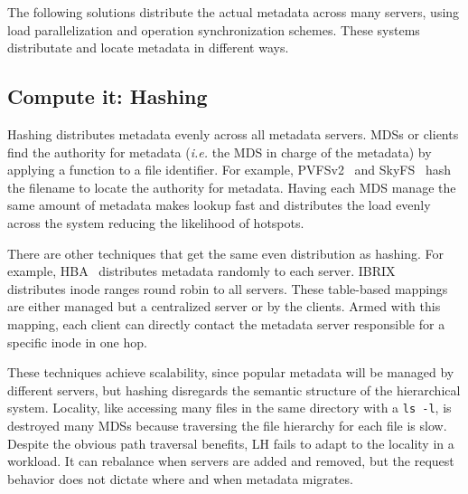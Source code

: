 The following solutions distribute the actual metadata across many servers, using load parallelization and operation synchronization schemes. These systems distributate and locate metadata in different ways.



\subsection{Compute it: Hashing}
Hashing distributes metadata evenly across all metadata servers. MDSs or clients find the authority for metadata ({\it i.e.} the MDS in charge of the metadata) by applying a function to a file identifier. For example, PVFSv2~\cite{hildebrand:msst2005-pnfs} and SkyFS~\cite{xing:sc2009-skyfs} hash the filename to locate the authority for metadata. Having each MDS manage the same amount of metadata makes lookup fast and distributes the load evenly across the system reducing the likelihood of hotspots.

There are other techniques that get the same even distribution as hashing. For example, HBA~\cite{zhu:pds2008-hba} distributes metadata randomly to each server. IBRIX~\cite{hp:whitepaper2012-storeall} distributes inode ranges round robin to all servers. These table-based mappings are either managed but a centralized server or by the clients. Armed with this mapping, each client can directly contact the metadata server responsible for a specific inode in one hop. 

These techniques achieve scalability, since popular metadata will be managed by different servers, but hashing disregards the semantic structure of the hierarchical system. Locality, like accessing many files in the same directory with a \texttt{ls -l}, is destroyed many MDSs because traversing the file hierarchy for each file is slow. Despite the obvious path traversal benefits, LH fails to adapt to the locality in a workload. It can rebalance when servers are added and removed, but the request behavior does not dictate where and when metadata migrates. 

